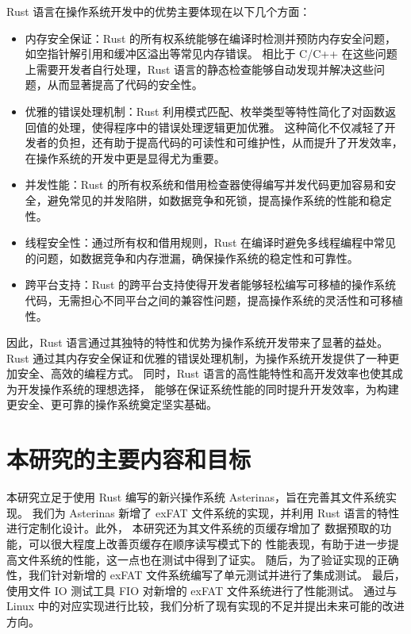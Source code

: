 Rust 语言在操作系统开发中的优势主要体现在以下几个方面：
\begin{itemize}
    \item 内存安全保证：Rust 的所有权系统能够在编译时检测并预防内存安全问题，如空指针解引用和缓冲区溢出等常见内存错误。
    相比于 C/C++ 在这些问题上需要开发者自行处理，Rust 语言的静态检查能够自动发现并解决这些问题，从而显著提高了代码的安全性。
    \item 优雅的错误处理机制：Rust 利用模式匹配、枚举类型等特性简化了对函数返回值的处理，使得程序中的错误处理逻辑更加优雅。
    这种简化不仅减轻了开发者的负担，还有助于提高代码的可读性和可维护性，从而提升了开发效率，在操作系统的开发中更是显得尤为重要。
    \item 并发性能：Rust 的所有权系统和借用检查器使得编写并发代码更加容易和安全，避免常见的并发陷阱，如数据竞争和死锁，提高操作系统的性能和稳定性。
    \item 线程安全性：通过所有权和借用规则，Rust 在编译时避免多线程编程中常见的问题，如数据竞争和内存泄漏，确保操作系统的稳定性和可靠性。
    \item 跨平台支持：Rust 的跨平台支持使得开发者能够轻松编写可移植的操作系统代码，无需担心不同平台之间的兼容性问题，提高操作系统的灵活性和可移植性。
\end{itemize}

因此，Rust 语言通过其独特的特性和优势为操作系统开发带来了显著的益处。
Rust 通过其内存安全保证和优雅的错误处理机制，为操作系统开发提供了一种更加安全、高效的编程方式。
同时，Rust 语言的高性能特性和高开发效率也使其成为开发操作系统的理想选择，
能够在保证系统性能的同时提升开发效率，为构建更安全、更可靠的操作系统奠定坚实基础。

\section{本研究的主要内容和目标}
本研究立足于使用 Rust 编写的新兴操作系统 Asterinas\parencite{Asterinas}，旨在完善其文件系统实现。
我们为 Asterinas 新增了 exFAT 文件系统\parencite{exFAT,exFAT1,exFAT2}的实现，并利用 Rust 语言的特性进行定制化设计。此外，
本研究还为其文件系统的页缓存\parencite{tanenbaum2014modern,ostep,bovet2005understanding}增加了
数据预取\parencite{readahead,sequential_prefetching}的功能，可以很大程度上改善页缓存在顺序读写模式下的
性能表现，有助于进一步提高文件系统的性能，这一点也在测试中得到了证实。
随后，为了验证实现的正确性，我们针对新增的 exFAT 文件系统编写了单元测试并进行了集成测试。
最后，使用文件 IO 测试工具 FIO 对新增的 exFAT 文件系统进行了性能测试。
通过与 Linux 中的对应实现进行比较，我们分析了现有实现的不足并提出未来可能的改进方向。

